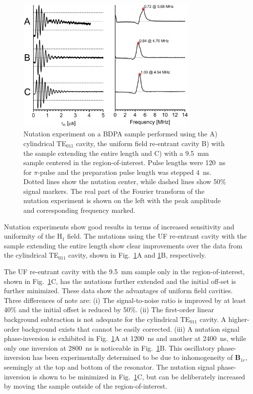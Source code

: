 \begin{figure}[htb]\centering
 \includegraphics[width=0.8\textwidth]{Kapitel/Ch2-Images/06a-Nutation.eps}
 \caption[Nutation experiment comparison.]{Nutation experiment on a BDPA sample performed using the A) cylindrical TE$_{011}$ cavity, the uniform field re-entrant \cylTE{} cavity B) with the sample extending the entire length and C) with a 9.5~mm sample centered in the region-of-interest. Pulse lengths were 120~ns for $\pi$-pulse and the preparation pulse length was stepped 4~ns. Dotted lines show the nutation center, while dashed lines show 50\% signal markers. The real part of the Fourier transform of the nutation experiment is shown on the left with the peak amplitude and corresponding frequency marked.}
 \label{Ch2-fig:nutation}
\end{figure}

Nutation experiments show good results in terms of increased sensitivity and uniformity of the H$_1$ field. The nutations using the UF re-entrant \cylTE{} cavity with the sample extending the entire length show clear improvements over the data from the cylindrical TE$_{011}$ cavity, shown in Fig.~\ref{Ch2-fig:nutation}A and \ref{Ch2-fig:nutation}B, respectively. 

The UF re-entrant \cylTE{} cavity with the 9.5~mm sample only in the region-of-interest, shown in Fig.~\ref{Ch2-fig:nutation}C, has the nutations further extended and the initial off-set is further minimized. These data show the advantages of uniform field cavities. Three differences of note are: (i) The signal-to-noise ratio is improved by at least 40\% and the initial offset is reduced by 50\%. (ii) The first-order linear background subtraction is not adequate for the cylindrical TE$_{011}$ cavity. A higher-order background exists that cannot be easily corrected. (iii) A nutation signal phase-inversion is exhibited in  Fig.~\ref{Ch2-fig:nutation}A at 1200~ns and another at 2400~ns, while only one inversion at 2800~ns is noticeable in Fig.~\ref{Ch2-fig:nutation}B. This oscillatory phase-inversion has been experimentally determined to be due to inhomogeneity of $\mathbf{B}_{1r}$, seemingly at the top and bottom of the resonator. The nutation signal phase-inversion is shown to be minimized in Fig.~\ref{Ch2-fig:nutation}C, but can be deliberately increased by moving the sample outside of the region-of-interest.

